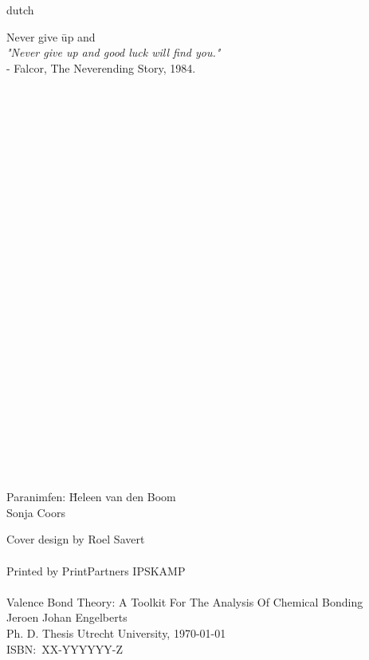 \begin{otherlanguage*}{dutch}
\newpage
\raggedright
\noindent
\begin{tabbing}
Never give \= up and \kill\\
\textit{"Never give up and good luck will find you."}\\
\> - Falcor, The Neverending Story, 1984.
\end{tabbing}
\mbox{ }\\
\mbox{ }\\
\mbox{ }\\
\mbox{ }\\
\mbox{ }\\
\mbox{ }\\
\mbox{ }\\
\mbox{ }\\
\mbox{ }\\
\mbox{ }\\
\mbox{ }\\
\mbox{ }\\
\mbox{ }\\
\mbox{ }\\
\mbox{ }\\
\mbox{ }\\
\mbox{ }\\
\mbox{ }\\
\mbox{ }\\
\mbox{ }\\
\mbox{ }\\
\mbox{ }\\
\mbox{ }\\
\mbox{ }\\
\mbox{ }\\
\begin{tabbing}
Paranimfen: \=Heleen van den Boom\\
            \>Sonja Coors
\end{tabbing}
Cover design by Roel Savert\\
\mbox{ }\\
Printed by PrintPartners IPSKAMP\\
\mbox{ }\\
Valence Bond Theory: A Toolkit For The Analysis Of Chemical Bonding\\
Jeroen Johan Engelberts\\
Ph. D. Thesis Utrecht University, \today \\
ISBN:~XX-YYYYYY-Z
\newpage

\end{otherlanguage*}

\tableofcontents

\mainmatter \pagestyle{fancy}

